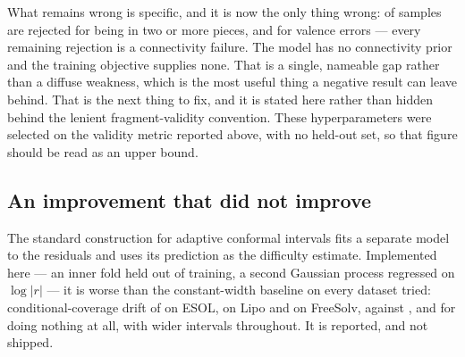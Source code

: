 What remains wrong is specific, and it is now the only thing wrong:
\genDisconnectedShare{} of samples are rejected for being in two or more pieces, and
\genValenceShare{} for valence errors --- every remaining rejection is a connectivity
failure. The model has no connectivity prior and the training objective supplies none.
That is a single, nameable gap rather than a diffuse weakness, which is the most useful
thing a negative result can leave behind. That is the next
thing to fix, and it is stated here rather than hidden behind the lenient
fragment-validity convention. These hyperparameters were selected on the validity
metric reported above, with no held-out set, so that figure should be read as an
upper bound.

\subsection{An improvement that did not improve}

The standard construction for adaptive conformal intervals
\cite{papadopoulos2011reliable} fits a separate model to the residuals and uses its
prediction as the difficulty estimate. Implemented here --- an inner fold held out of
training, a second Gaussian process regressed on $\log|r|$ --- it is worse than the
constant-width baseline on every dataset tried: conditional-coverage drift of
\confEsolResidSpread{} on ESOL, \confLipoResidSpread{} on Lipo and
\confFreesolvResidSpread{} on FreeSolv, against \confEsolStdSpread{},
\confLipoStdSpread{} and \confFreesolvStdSpread{} for doing nothing at all, with
wider intervals throughout. It is reported, and not shipped.
